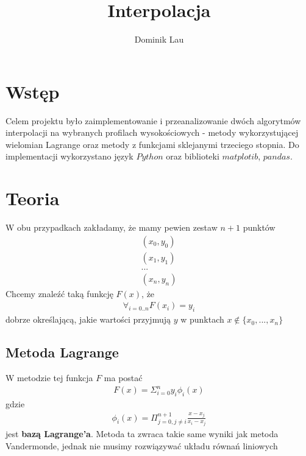 \documentclass{article}
\title{Interpolacja}
\author{Dominik Lau}
\begin{document}
\maketitle
\section{Wstęp}
Celem projektu było zaimplementowanie i przeanalizowanie dwóch
algorytmów interpolacji na wybranych profilach wysokościowych - metody wykorzystującej wielomian Lagrange oraz metody z funkcjami sklejanymi trzeciego stopnia.
Do implementacji wykorzystano język $Python$ oraz biblioteki
$matplotib$, $pandas$.
\section{Teoria}
W obu przypadkach zakładamy, że mamy pewien zestaw $n+1$ punktów
\begin{gather*}
	(x_0, y_0) \\
	(x_1, y_1) \\
	...\\
	(x_n, y_n)
\end{gather*}
Chcemy znaleźć taką funkcję $F(x)$, że
\begin{gather*}
	\forall_{i= 0..n}  F(x_i) = y_i
\end{gather*}
dobrze określającą, jakie wartości przyjmują $y$ w punktach $x \notin \{x_0, ..., x_n\}$
\subsection{Metoda Lagrange}
W metodzie tej funkcja $F$ ma postać
\begin{gather*}
	F(x) = \Sigma_{i=0}^{n} y_i \phi_i(x)
\end{gather*}
gdzie 
\begin{gather*}
	\phi_i(x) = \Pi_{j=0,  j \ne i}^{n+1} \frac{x-x_j}{x_i - x_j}
\end{gather*}
jest \textbf{bazą Lagrange'a}. Metoda ta zwraca takie same wyniki
jak metoda Vandermonde, jednak nie musimy rozwiązywać układu równań liniowych
\end{document}
